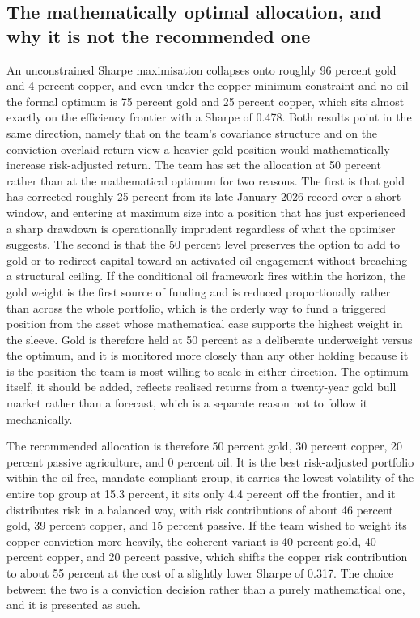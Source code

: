 \documentclass[11pt,a4paper]{article}
\begin{document}
\subsection{The mathematically optimal allocation, and why it is not the recommended one}

An unconstrained Sharpe maximisation collapses onto roughly 96 percent gold and 4 percent copper, and even under the copper minimum constraint and no oil the formal optimum is 75 percent gold and 25 percent copper, which sits almost exactly on the efficiency frontier with a Sharpe of 0.478. Both results point in the same direction, namely that on the team's covariance structure and on the conviction-overlaid return view a heavier gold position would mathematically increase risk-adjusted return. The team has set the allocation at 50 percent rather than at the mathematical optimum for two reasons. The first is that gold has corrected roughly 25 percent from its late-January 2026 record over a short window, and entering at maximum size into a position that has just experienced a sharp drawdown is operationally imprudent regardless of what the optimiser suggests. The second is that the 50 percent level preserves the option to add to gold or to redirect capital toward an activated oil engagement without breaching a structural ceiling. If the conditional oil framework fires within the horizon, the gold weight is the first source of funding and is reduced proportionally rather than across the whole portfolio, which is the orderly way to fund a triggered position from the asset whose mathematical case supports the highest weight in the sleeve. Gold is therefore held at 50 percent as a deliberate underweight versus the optimum, and it is monitored more closely than any other holding because it is the position the team is most willing to scale in either direction. The optimum itself, it should be added, reflects realised returns from a twenty-year gold bull market rather than a forecast, which is a separate reason not to follow it mechanically.

The recommended allocation is therefore 50 percent gold, 30 percent copper, 20 percent passive agriculture, and 0 percent oil. It is the best risk-adjusted portfolio within the oil-free, mandate-compliant group, it carries the lowest volatility of the entire top group at 15.3 percent, it sits only 4.4 percent off the frontier, and it distributes risk in a balanced way, with risk contributions of about 46 percent gold, 39 percent copper, and 15 percent passive. If the team wished to weight its copper conviction more heavily, the coherent variant is 40 percent gold, 40 percent copper, and 20 percent passive, which shifts the copper risk contribution to about 55 percent at the cost of a slightly lower Sharpe of 0.317. The choice between the two is a conviction decision rather than a purely mathematical one, and it is presented as such.
\end{document}
